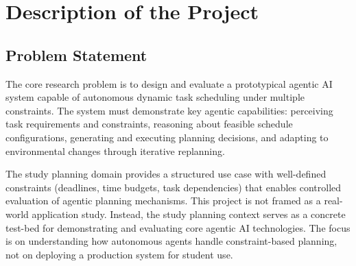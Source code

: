 \documentclass[12pt]{article}
\begin{document}
\section{Description of the Project}
\subsection{Problem Statement}
The core research problem is to design and evaluate a prototypical agentic AI system capable of autonomous dynamic task scheduling under multiple constraints. The system must demonstrate key agentic capabilities: perceiving task requirements and constraints, reasoning about feasible schedule configurations, generating and executing planning decisions, and adapting to environmental changes through iterative replanning.

The study planning domain provides a structured use case with well-defined constraints (deadlines, time budgets, task dependencies) that enables controlled evaluation of agentic planning mechanisms. This project is not framed as a real-world application study. Instead, the study planning context serves as a concrete test-bed for demonstrating and evaluating core agentic AI technologies. The focus is on understanding how autonomous agents handle constraint-based planning, not on deploying a production system for student use.
\end{document}
